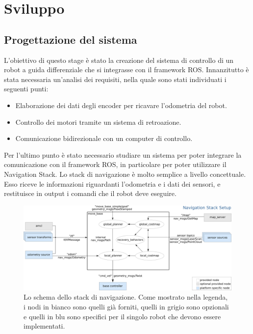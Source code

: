 \chapter{Sviluppo}

\section{Progettazione del sistema}
L'obiettivo di questo stage è stato la creazione del sistema di controllo di un robot a guida differenziale che si integrasse con il framework ROS.
Innanzitutto è stata necessaria un'analisi dei requisiti, nella quale sono stati individuati i seguenti punti: 
\begin{itemize}
    \item Elaborazione dei dati degli encoder per ricavare l'odometria del robot.
    \item Controllo dei motori tramite un sistema di retroazione.
    \item Comunicazione bidirezionale con un computer di controllo.
\end{itemize}

Per l'ultimo punto è stato necessario studiare un sistema per poter integrare la comunicazione con il framework ROS, in particolare per poter utilizzare il Navigation Stack.
Lo stack di navigazione è molto semplice a livello concettuale. Esso riceve le informazioni riguardanti l'odometria e i dati dei sensori, e restituisce in output i comandi che il robot deve eseguire.

\begin{figure}[h]
    \centering
    \includegraphics[scale=0.38]{images/navigation_stack.png}
    \caption{Lo schema dello stack di navigazione. Come mostrato nella legenda, i nodi in
bianco sono quelli già forniti, quelli in grigio sono opzionali e quelli in blu sono specifici per il singolo robot che devono essere implementati.}
  \label{fig:navigation_stack}
\end{figure}

